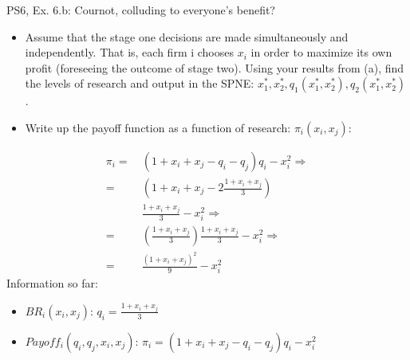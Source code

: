 \begin{frame}{PS6, Ex. 6.b: Cournot, colluding to everyone's benefit?}
    \begin{itemize}
    \item[(b)] Assume that the stage one decisions are made simultaneously and independently. That is, each firm i chooses $x_i$ in order to maximize its own profit (foreseeing the outcome of stage two). Using your results from (a), find the levels of research and output in the SPNE: $x_1^*,x_2^*,q_1(x_1^*,x_2^*),q_2(x_1^*,x_2^*)$.
    \end{itemize}
  \begin{multicols}{2}
    \begin{itemize}
      \item[(Step a)] Write up the payoff function as a function of research: $\pi_i(x_i,x_j)$:
    \end{itemize}
    \begin{align*}
      \pi_i =&\ (1+x_i+x_j-q_i-q_j)q_i-x_i^2\Rightarrow\\
            =&\ \left(1+x_i+x_j-2\frac{1+x_i+x_j}{3}\right)\\
             &\ \frac{1+x_i+x_j}{3}-x_i^2\Rightarrow\\
            =&\ \left(\frac{1+x_i+x_j}{3}\right)\frac{1+x_i+x_j}{3}-x_i^2\Rightarrow\\
            =&\ \frac{(1+x_i+x_j)^2}{9}-x_i^2
    \end{align*}
    \vfill\null \columnbreak
    Information so far:
    \begin{itemize}
    \item[1] $BR_i(x_i,x_j)$: $q_i = \frac{1+x_i+x_j}{3}$
    \item[2] $Payoff_i(q_i,q_j,x_i,x_j)$: $\pi_i=(1+x_i+x_j-q_i-q_j)q_i-x_i^2$
    \end{itemize}
    \vfill\null
  \end{multicols}
\end{frame}
